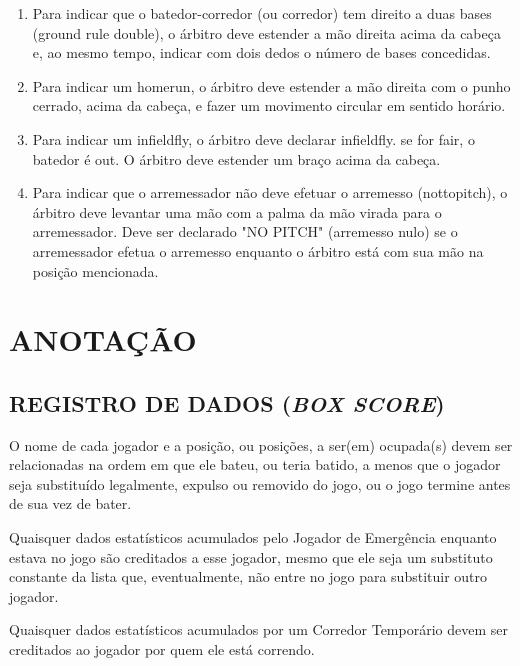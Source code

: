 \begin{enumerate}[label=(\alph*)]
	\item Para indicar que o batedor-corredor (ou corredor) tem direito a duas bases (\gls{ground rule double}), o árbitro deve estender a mão direita
	 acima da cabeça e, ao mesmo tempo, indicar com dois dedos o número de bases concedidas.
	\item Para indicar um \gls{homerun}, o árbitro deve estender a mão direita com o punho cerrado, acima da cabeça, e fazer um movimento circular em sentido horário.
	\item Para indicar um \gls{infieldfly}, o árbitro deve declarar \gls{infieldfly}. se for \gls{fair}, o batedor é \gls{out}. O árbitro deve estender um braço acima da cabeça.
	\item Para indicar que o arremessador não deve efetuar o arremesso (\gls{nottopitch}), o árbitro deve levantar uma mão com a palma da mão virada para o arremessador. Deve ser declarado "NO PITCH" (arremesso nulo) se o arremessador efetua o arremesso enquanto o árbitro está com sua mão na posição mencionada.
\end{enumerate}

\chapter{ANOTAÇÃO}
\minitoc%

\section{REGISTRO DE DADOS (\textit{BOX SCORE})}

		O nome de cada jogador e a posição, ou posições, a ser(em) ocupada(s) devem ser relacionadas na ordem em que ele bateu, ou teria batido, a menos que o jogador seja substituído legalmente, expulso ou removido do jogo, ou o jogo termine antes de sua vez de bater.

		Quaisquer dados estatísticos acumulados pelo Jogador de Emergência enquanto estava no jogo são creditados a esse jogador, mesmo que ele seja um substituto constante da lista que, eventualmente, não entre no jogo para substituir outro jogador.

		Quaisquer dados estatísticos acumulados por um Corredor Temporário devem ser creditados ao jogador por quem ele está correndo.


